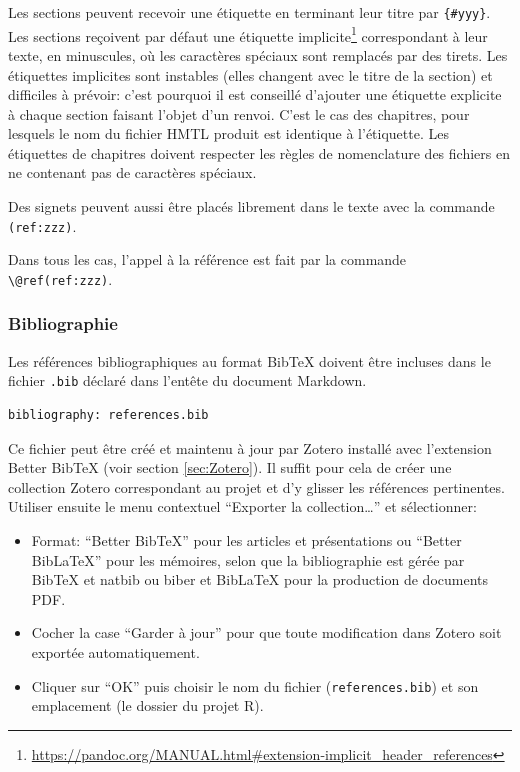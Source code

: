 \documentclass[
  12pt,
  french,
  a4paper,
  extrafontsizes,onecolumn,openright
  ]{memoir}
\providecommand{\tightlist}{%
  \setlength{\itemsep}{0pt}\setlength{\parskip}{0pt}}
\begin{document}
Les sections peuvent recevoir une étiquette en terminant leur titre par \texttt{\{\#yyy\}}.
Les sections reçoivent par défaut une étiquette implicite\footnote{\url{https://pandoc.org/MANUAL.html\#extension-implicit_header_references}} correspondant à leur texte, en minuscules, où les caractères spéciaux sont remplacés par des tirets.
Les étiquettes implicites sont instables (elles changent avec le titre de la section) et difficiles à prévoir: c'est pourquoi il est conseillé d'ajouter une étiquette explicite à chaque section faisant l'objet d'un renvoi.
C'est le cas des chapitres, pour lesquels le nom du fichier HMTL produit est identique à l'étiquette.
Les étiquettes de chapitres doivent respecter les règles de nomenclature des fichiers en ne contenant pas de caractères spéciaux.

Des signets peuvent aussi être placés librement dans le texte avec la commande \texttt{(ref:zzz)}.

Dans tous les cas, l'appel à la référence est fait par la commande \texttt{\textbackslash{}@ref(ref:zzz)}.

\subsubsection{Bibliographie}\label{bibliographie}

Les références bibliographiques au format BibTeX doivent être incluses dans le fichier \texttt{.bib} déclaré dans l'entête du document Markdown.

\begin{verbatim}
bibliography: references.bib
\end{verbatim}

Ce fichier peut être créé et maintenu à jour par Zotero installé avec l'extension Better BibTeX (voir section \ref{sec:Zotero}).
Il suffit pour cela de créer une collection Zotero correspondant au projet et d'y glisser les références pertinentes.
Utiliser ensuite le menu contextuel \enquote{Exporter la collection\ldots{}} et sélectionner:

\begin{itemize}
\tightlist
\item
  Format: \enquote{Better BibTeX} pour les articles et présentations ou \enquote{Better BibLaTeX} pour les mémoires, selon que la bibliographie est gérée par BibTeX et natbib ou biber et BibLaTeX pour la production de documents PDF.
\item
  Cocher la case \enquote{Garder à jour} pour que toute modification dans Zotero soit exportée automatiquement.
\item
  Cliquer sur \enquote{OK} puis choisir le nom du fichier (\texttt{references.bib}) et son emplacement (le dossier du projet R).
\end{itemize}
\end{document}
